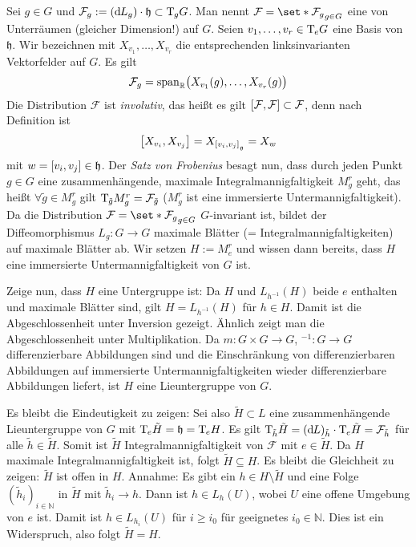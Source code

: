 \begin{beweis}
	Sei $g \in G$ und $\mathcal{F}_g := (\mathd L_g) \cdot \mathfrak{h} \subset \Tmap_g G$.
	Man nennt $\mathcal{F} = \set*{\mathcal{F}_g}_{g \in G}$ eine  von Unterräumen (gleicher Dimension!) auf $G$.
	Seien $v_1, \ldots ,v_r \in \Tmap_e G$ eine Basis von $\mathfrak{h}$.
	Wir bezeichnen mit $X_{v_1}, \ldots ,X_{v_r}$ die entsprechenden linksinvarianten Vektorfelder auf $G$.
	Es gilt
	\[
		\mathcal{F}_g = \Span_\mathbb{R} \enbrace[\big]{X_{v_1}(g), \ldots , X_{v_r}(g)}
	\]
	Die Distribution $\mathcal{F}$ ist \emph{involutiv}, das heißt es gilt $\benbrace*{\mathcal{F},\mathcal{F}} \subset \mathcal{F}$, denn nach Definition ist
	\[
		\benbrace[\big]{X_{v_i}, X_{v_j}} = X_{\benbrace*{v_i,v_j}_{\mathfrak{g}}} = X_w
	\]
	mit $w= \benbrace*{v_i,v_j} \in \mathfrak{h}$.
	Der \emph{Satz von Frobenius} \cite{LeeSmooth} besagt nun, dass durch jeden Punkt $g \in G$ eine zusammenhängende, maximale Integralmannigfaltigkeit $M^r_g$ geht, das heißt $\forall \tilde{g} \in M^r_g$ gilt $\Tmap_{\tilde{g}} M^r_g = \mathcal{F}_{\tilde{g}}$
	($M^r_g$ ist eine immersierte Untermannigfaltigkeit).
	Da die Distribution $\mathcal{F} = \set*{\mathcal{F}_g}_{g \in G}$ $G$-invariant ist, bildet der Diffeomorphismus $L_g \colon G \to G$ maximale Blätter (= Integralmannigfaltigkeiten) auf maximale Blätter ab.
	Wir setzen $H := M^r_e$ und wissen dann bereits, dass $H$ eine immersierte Untermannigfaltigkeit von $G$ ist.
	
	Zeige nun, dass $H$ eine Untergruppe ist:
	Da $H$ und $L_{h^{-1}}(H)$ beide $e$ enthalten und maximale Blätter sind, gilt $H=L_{h^{-1}}(H)$ für $h \in H$.
	Damit ist die Abgeschlossenheit unter Inversion gezeigt.
	Ähnlich zeigt man die Abgeschlossenheit unter Multiplikation.
	Da $m \colon G  \times G \to G$, $^{-1} \colon G \to G$ differenzierbare Abbildungen sind und die Einschränkung von differenzierbaren Abbildungen auf immersierte Untermannigfaltigkeiten wieder differenzierbare Abbildungen liefert, ist $H$ eine Lieuntergruppe von $G$.
	
	Es bleibt die Eindeutigkeit zu zeigen: 
	Sei also $\tilde{H} \subset L$ eine zusammenhängende Lieuntergruppe von $G$ mit $\Tmap_e \tilde{H} = \mathfrak{h} = \Tmap_e H$.
	Es gilt $\Tmap_{\tilde{h}} \tilde{H} = (\mathd L)_{\tilde{h}} \cdot \Tmap_e \tilde{H}= \mathcal{F}_{\tilde{h}}$ für alle $\tilde{h} \in \tilde{H}$.
	Somit ist $\tilde{H}$ Integralmannigfaltigkeit von $\mathcal{F}$ mit $e \in \tilde{H}$.
	Da $H$ maximale Integralmannigfaltigkeit ist, folgt $\tilde{H} \subseteq H$.
	Es bleibt die Gleichheit zu zeigen:
	$\tilde{H}$ ist offen in $H$.
	Annahme: Es gibt ein $h \in H \setminus \tilde{H}$ und eine Folge $(\tilde{h}_i)_{i \in \mathbb{N}}$ in $\tilde{H}$ mit $\tilde{h}_i \to h$.
	Dann ist $h \in L_h(U)$, wobei $U$ eine offene Umgebung von $e$ ist.
	Damit ist $h \in L_{h_i}(U)$ für $i \ge i_0$ für geeignetes $i_0 \in \mathbb{N}$.
	Dies ist ein Widerspruch, also folgt $\tilde{H}=H$.
\end{beweis}

